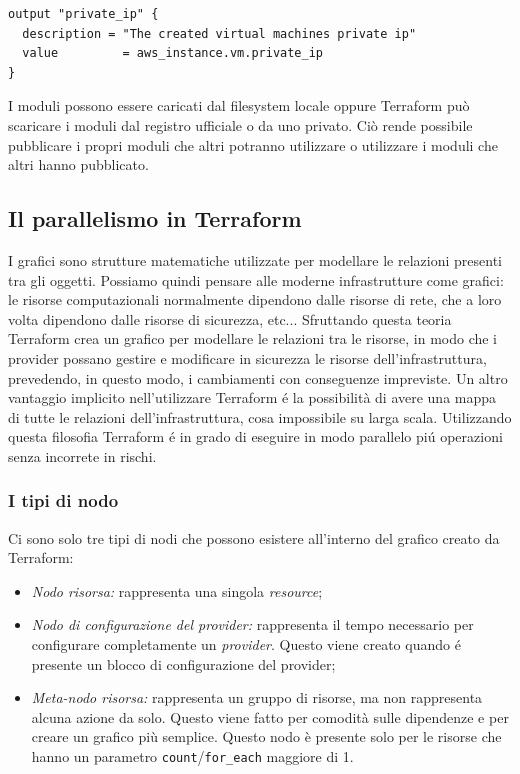 \documentclass[12pt, a4paper, titlepage]{article}
\newenvironment{code}{\captionsetup{type=listing}}{}
\begin{document}
\begin{code}
	\begin{verbatim}
output "private_ip" {
  description = "The created virtual machines private ip"
  value         = aws_instance.vm.private_ip
}
	\end{verbatim}
\end{code}
\bigskip

I moduli possono essere caricati dal filesystem locale oppure Terraform può scaricare i moduli dal registro ufficiale\cite{terraform_registry} o da uno privato. Ciò rende possibile pubblicare i propri moduli che altri potranno utilizzare o utilizzare i moduli che altri hanno pubblicato.

\subsection{Il parallelismo in Terraform}
I grafici sono strutture matematiche utilizzate per modellare le relazioni presenti  tra gli oggetti. Possiamo quindi pensare alle moderne infrastrutture come grafici: le risorse computazionali normalmente dipendono dalle risorse di rete, che a loro volta dipendono dalle risorse di sicurezza, etc... 
Sfruttando questa teoria Terraform crea un grafico per modellare le relazioni tra le risorse, in modo che i provider possano gestire e modificare in sicurezza le risorse dell'infrastruttura, prevedendo, in questo modo, i cambiamenti con conseguenze impreviste.
Un altro vantaggio implicito nell'utilizzare Terraform é la possibilità di avere una mappa di tutte le relazioni dell'infrastruttura, cosa impossibile su larga scala. Utilizzando questa filosofia Terraform é in grado di eseguire in modo parallelo piú operazioni senza incorrete in rischi.

\subsubsection{I tipi di nodo}
Ci sono solo tre tipi di nodi che possono esistere all'interno del grafico creato da Terraform:

\begin{itemize}
	\item \textit{Nodo risorsa:} rappresenta una singola \textit{resource};

	\item \textit{Nodo di configurazione del provider:}  rappresenta il tempo necessario 			per configurare completamente un \textit{provider}. Questo viene creato quando é presente un blocco di configurazione del provider;

	\item \textit{Meta-nodo risorsa:} rappresenta un gruppo di risorse, ma non 				rappresenta alcuna azione da solo. Questo viene fatto per comodità sulle dipendenze e 	per creare un grafico più semplice. Questo nodo è presente solo per le risorse che 			hanno un parametro \texttt{count}/\texttt{for\_each} maggiore di 1.
\end{itemize}
 
\end{document}
